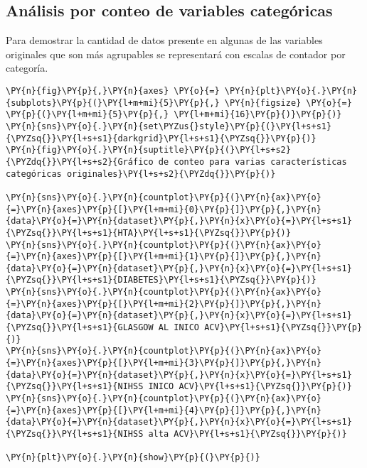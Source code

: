     \hypertarget{anuxe1lisis-por-conteo-de-variables-categuxf3ricas}{%
\subsection{Análisis por conteo de variables
categóricas}\label{anuxe1lisis-por-conteo-de-variables-categuxf3ricas}}

Para demostrar la cantidad de datos presente en algunas de las variables
originales que son más agrupables se representará con escalas de
contador por categoría.

    \begin{tcolorbox}[breakable, size=fbox, boxrule=1pt, pad at break*=1mm,colback=cellbackground, colframe=cellborder]
\begin{Verbatim}[commandchars=\\\{\}]
\PY{n}{fig}\PY{p}{,}\PY{n}{axes} \PY{o}{=} \PY{n}{plt}\PY{o}{.}\PY{n}{subplots}\PY{p}{(}\PY{l+m+mi}{5}\PY{p}{,} \PY{n}{figsize} \PY{o}{=} \PY{p}{(}\PY{l+m+mi}{5}\PY{p}{,} \PY{l+m+mi}{16}\PY{p}{)}\PY{p}{)}
\PY{n}{sns}\PY{o}{.}\PY{n}{set\PYZus{}style}\PY{p}{(}\PY{l+s+s1}{\PYZsq{}}\PY{l+s+s1}{darkgrid}\PY{l+s+s1}{\PYZsq{}}\PY{p}{)}
\PY{n}{fig}\PY{o}{.}\PY{n}{suptitle}\PY{p}{(}\PY{l+s+s2}{\PYZdq{}}\PY{l+s+s2}{Gráfico de conteo para varias características categóricas originales}\PY{l+s+s2}{\PYZdq{}}\PY{p}{)}

\PY{n}{sns}\PY{o}{.}\PY{n}{countplot}\PY{p}{(}\PY{n}{ax}\PY{o}{=}\PY{n}{axes}\PY{p}{[}\PY{l+m+mi}{0}\PY{p}{]}\PY{p}{,}\PY{n}{data}\PY{o}{=}\PY{n}{dataset}\PY{p}{,}\PY{n}{x}\PY{o}{=}\PY{l+s+s1}{\PYZsq{}}\PY{l+s+s1}{HTA}\PY{l+s+s1}{\PYZsq{}}\PY{p}{)}
\PY{n}{sns}\PY{o}{.}\PY{n}{countplot}\PY{p}{(}\PY{n}{ax}\PY{o}{=}\PY{n}{axes}\PY{p}{[}\PY{l+m+mi}{1}\PY{p}{]}\PY{p}{,}\PY{n}{data}\PY{o}{=}\PY{n}{dataset}\PY{p}{,}\PY{n}{x}\PY{o}{=}\PY{l+s+s1}{\PYZsq{}}\PY{l+s+s1}{DIABETES}\PY{l+s+s1}{\PYZsq{}}\PY{p}{)}
\PY{n}{sns}\PY{o}{.}\PY{n}{countplot}\PY{p}{(}\PY{n}{ax}\PY{o}{=}\PY{n}{axes}\PY{p}{[}\PY{l+m+mi}{2}\PY{p}{]}\PY{p}{,}\PY{n}{data}\PY{o}{=}\PY{n}{dataset}\PY{p}{,}\PY{n}{x}\PY{o}{=}\PY{l+s+s1}{\PYZsq{}}\PY{l+s+s1}{GLASGOW AL INICO ACV}\PY{l+s+s1}{\PYZsq{}}\PY{p}{)}
\PY{n}{sns}\PY{o}{.}\PY{n}{countplot}\PY{p}{(}\PY{n}{ax}\PY{o}{=}\PY{n}{axes}\PY{p}{[}\PY{l+m+mi}{3}\PY{p}{]}\PY{p}{,}\PY{n}{data}\PY{o}{=}\PY{n}{dataset}\PY{p}{,}\PY{n}{x}\PY{o}{=}\PY{l+s+s1}{\PYZsq{}}\PY{l+s+s1}{NIHSS INICO ACV}\PY{l+s+s1}{\PYZsq{}}\PY{p}{)}
\PY{n}{sns}\PY{o}{.}\PY{n}{countplot}\PY{p}{(}\PY{n}{ax}\PY{o}{=}\PY{n}{axes}\PY{p}{[}\PY{l+m+mi}{4}\PY{p}{]}\PY{p}{,}\PY{n}{data}\PY{o}{=}\PY{n}{dataset}\PY{p}{,}\PY{n}{x}\PY{o}{=}\PY{l+s+s1}{\PYZsq{}}\PY{l+s+s1}{NIHSS alta ACV}\PY{l+s+s1}{\PYZsq{}}\PY{p}{)}

\PY{n}{plt}\PY{o}{.}\PY{n}{show}\PY{p}{(}\PY{p}{)}
\end{Verbatim}
\end{tcolorbox}

